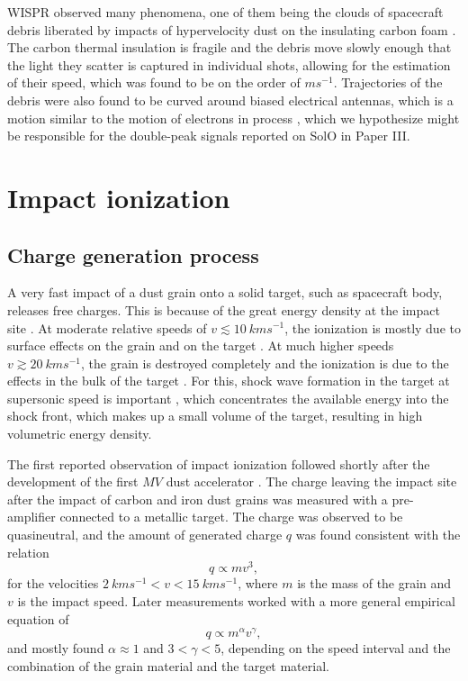 WISPR observed many phenomena, one of them being the clouds of spacecraft debris liberated by impacts of hypervelocity dust on the insulating carbon foam \citep{malaspina2022clouds}. The carbon thermal insulation is fragile and the debris move slowly enough that the light they scatter is captured in individual shots, allowing for the estimation of their speed, which was found to be on the order of $\si{m s^{-1}}$. Trajectories of the debris were also found to be curved around biased electrical antennas, which is a motion similar to the motion of electrons in \citeauthor{pantellini2012nano} process \citep{pantellini2012nano}, which we hypothesize might be responsible for the double-peak signals reported on SolO in Paper III. 


\section{Impact ionization}

\subsection{Charge generation process}

A very fast impact of a dust grain onto a solid target, such as spacecraft body, releases free charges. This is because of the great energy density at the impact site \citep{shen2021cosmic}. At moderate relative speeds of $v \lesssim \SI{10}{kms^{-1}}$, the ionization is mostly due to surface effects on the grain and on the target \citep{kissel1987ion}. At much higher speeds $v \gtrsim \SI{20}{kms^{-1}}$, the grain is destroyed completely and the ionization is due to the effects in the bulk of the target \citep{hornung1994shock}. For this, shock wave formation in the target at supersonic speed is important \citep{drapatz1974theory}, which concentrates the available energy into the shock front, which makes up a small volume of the target, resulting in high volumetric energy density. 

The first reported observation \citep{friichtenicht1964} of impact ionization followed shortly after the development of the first $MV$ dust accelerator \citep{friichtenicht1962}. The charge leaving the impact site after the impact of carbon and iron dust grains was measured with a pre-amplifier connected to a metallic target. The charge was observed to be quasineutral, and the amount of generated charge $q$ was found consistent with the relation
\begin{equation}
    q \propto m v^3,
\end{equation}
for the velocities  $\SI{2}{kms^{-1}} < v < \SI{15}{kms^{-1}}$, where $m$ is the mass of the grain and $v$ is the impact speed. Later measurements \citep{auer1968,mcbride1999meteoroid,grun1984impact,collette2014micrometeoroid,shen2021cosmic} worked with a more general empirical equation of 
\begin{equation}
    q \propto m^\alpha v^\gamma, \label{eq:charge_generation}
\end{equation}
and mostly found $\alpha \approx 1$ and $3 < \gamma < 5$, depending on the speed interval and the combination of the grain material and the target material. 

